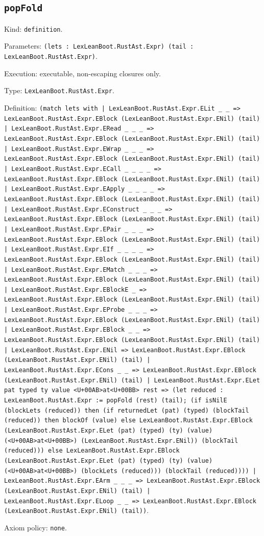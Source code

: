 \documentclass[11pt]{article}
\begin{document}
\subsection*{\texttt{popFold}}
\noindent Kind: \texttt{definition}.\par
\noindent Parameters: \texttt{(lets : LexLeanBoot.RustAst.Expr) (tail : LexLeanBoot.RustAst.Expr)}.\par
\noindent Execution: executable, non-escaping closures only.\par
\noindent Type: \texttt{LexLeanBoot.RustAst.Expr}.\par
\noindent Definition: \texttt{(match lets with | LexLeanBoot.RustAst.Expr.ELit \_ \_ => LexLeanBoot.RustAst.Expr.EBlock (LexLeanBoot.RustAst.Expr.ENil) (tail) | LexLeanBoot.RustAst.Expr.ERead \_ \_ \_ => LexLeanBoot.RustAst.Expr.EBlock (LexLeanBoot.RustAst.Expr.ENil) (tail) | LexLeanBoot.RustAst.Expr.EWrap \_ \_ \_ => LexLeanBoot.RustAst.Expr.EBlock (LexLeanBoot.RustAst.Expr.ENil) (tail) | LexLeanBoot.RustAst.Expr.ECall \_ \_ \_ \_ => LexLeanBoot.RustAst.Expr.EBlock (LexLeanBoot.RustAst.Expr.ENil) (tail) | LexLeanBoot.RustAst.Expr.EApply \_ \_ \_ \_ => LexLeanBoot.RustAst.Expr.EBlock (LexLeanBoot.RustAst.Expr.ENil) (tail) | LexLeanBoot.RustAst.Expr.EConstruct \_ \_ \_ => LexLeanBoot.RustAst.Expr.EBlock (LexLeanBoot.RustAst.Expr.ENil) (tail) | LexLeanBoot.RustAst.Expr.EPair \_ \_ \_ => LexLeanBoot.RustAst.Expr.EBlock (LexLeanBoot.RustAst.Expr.ENil) (tail) | LexLeanBoot.RustAst.Expr.EIf \_ \_ \_ \_ => LexLeanBoot.RustAst.Expr.EBlock (LexLeanBoot.RustAst.Expr.ENil) (tail) | LexLeanBoot.RustAst.Expr.EMatch \_ \_ \_ => LexLeanBoot.RustAst.Expr.EBlock (LexLeanBoot.RustAst.Expr.ENil) (tail) | LexLeanBoot.RustAst.Expr.EBlockE \_ => LexLeanBoot.RustAst.Expr.EBlock (LexLeanBoot.RustAst.Expr.ENil) (tail) | LexLeanBoot.RustAst.Expr.EProbe \_ \_ \_ => LexLeanBoot.RustAst.Expr.EBlock (LexLeanBoot.RustAst.Expr.ENil) (tail) | LexLeanBoot.RustAst.Expr.EBlock \_ \_ => LexLeanBoot.RustAst.Expr.EBlock (LexLeanBoot.RustAst.Expr.ENil) (tail) | LexLeanBoot.RustAst.Expr.ENil => LexLeanBoot.RustAst.Expr.EBlock (LexLeanBoot.RustAst.Expr.ENil) (tail) | LexLeanBoot.RustAst.Expr.ECons \_ \_ => LexLeanBoot.RustAst.Expr.EBlock (LexLeanBoot.RustAst.Expr.ENil) (tail) | LexLeanBoot.RustAst.Expr.ELet pat typed ty value <U+00AB>at<U+00BB> rest => (let reduced : LexLeanBoot.RustAst.Expr := popFold (rest) (tail); (if isNilE (blockLets (reduced)) then (if returnedLet (pat) (typed) (blockTail (reduced)) then blockOf (value) else LexLeanBoot.RustAst.Expr.EBlock (LexLeanBoot.RustAst.Expr.ELet (pat) (typed) (ty) (value) (<U+00AB>at<U+00BB>) (LexLeanBoot.RustAst.Expr.ENil)) (blockTail (reduced))) else LexLeanBoot.RustAst.Expr.EBlock (LexLeanBoot.RustAst.Expr.ELet (pat) (typed) (ty) (value) (<U+00AB>at<U+00BB>) (blockLets (reduced))) (blockTail (reduced)))) | LexLeanBoot.RustAst.Expr.EArm \_ \_ \_ => LexLeanBoot.RustAst.Expr.EBlock (LexLeanBoot.RustAst.Expr.ENil) (tail) | LexLeanBoot.RustAst.Expr.ELoop \_ \_ => LexLeanBoot.RustAst.Expr.EBlock (LexLeanBoot.RustAst.Expr.ENil) (tail))}.\par
\noindent Axiom policy: \texttt{none}.\par
\end{document}
